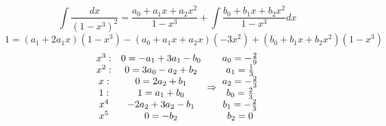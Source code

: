 \documentclass[main]{subfiles}
\begin{document}
    \begin{Example}
        \[\int \frac{dx}{(1 - x^3)^2} = \frac{a_0 + a_1 x + a_2 x^2}{1 - x^3} + \int \frac{b_0 + b_1 x + b_2 x^2}{1 - x^3} dx\]
        \[1 = (a_1 + 2a_1 x)(1 - x^3) - (a_0 + a_1 x + a_2 x) (-3 x^2) + (b_0 + b_1 x + b_2 x^2)(1 - x^3)\]
        \[\begin{matrix}
            x^3: & 0 = -a_1 + 3a_1 - b_0\\
            x^2: & 0 = 3a_0 - a_2 + b_2\\
            x: & 0 = 2a_2 + b_1\\
            1: & 1 = a_1 + b_0\\
            x^4 & -2a_2 + 3a_2 - b_1\\
            x^5 & 0 = - b_2\\
        \end{matrix} \ \Rightarrow\  \begin{matrix}
            a_0 = - \frac{2}{9}\\
            a_1 = \frac{1}{3}\\
            a_2 = -\frac{2}{3}\\
            b_0 = \frac{2}{3}\\
            b_1 = -\frac{2}{3}\\
            b_2 = 0
        \end{matrix}\]
    \end{Example}
\end{document}
